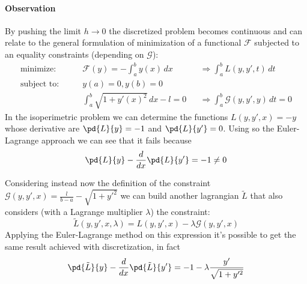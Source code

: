 	\paragraph{Observation} By pushing the limit $h\rightarrow 0$ the discretized problem becomes continuous and can relate to the general formulation of minimization of a functional $\mathcal F$ subjected to an equality constraints (depending on $\mathcal G$):
	\begin{align*}
		\textrm{minimize:} \qquad & \mathcal F(y) = - \int_a^b y(x)\, dx && \Rightarrow \int_a^b  L (y,y',t)\,dt \\
		\textrm{subject to:} \qquad & y(a) = 0 , y(b) = 0\\ & \int_a^b \sqrt{1+y'(x)^2}\, dx - l = 0 && \Rightarrow \int_a^b \mathcal G(y,y',y)\, dt = 0
	\end{align*}
	In the isoperimetric problem we can determine the functions $ L (y,y',x) = -y$ whose derivative are $\pd{ L }{y} = -1$ and $\pd{ L }{y'} = 0$. Using so the Euler-Lagrange approach we can see that it fails because
	\[ \pd{ L }{y } - \frac{d}{dx} \pd{ L }{y'} = - 1 \neq 0 \]
	
	Considering instead now the definition of the constraint $\mathcal G(y,y',x) = \frac{l}{b-a} - \sqrt{1 + y'^2}$ we can build another lagrangian $\tilde{ L }$ that also considers (with a Lagrange multiplier $\lambda$) the constraint:
	\[ \tilde{ L }(y,y',x,\lambda) =  L (y,y',x) - \lambda \mathcal G(y,y',x) \]
	Applying the Euler-Lagrange method on this expression it's possible to get the same result achieved with discretization, in fact
	\[ \pd{\tilde{ L }}{y} - \frac{d}{dx} \pd{\tilde{ L }}{y'} = - 1 - \lambda \frac{y'}{\sqrt{1 + y'^2}} \]
	
